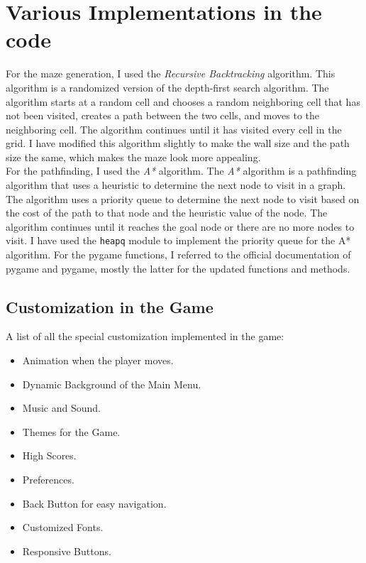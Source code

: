 \documentclass[10pt]{article}
\begin{document}
    \section{Various Implementations in the code}\label{sec:my-project-journey-and-various-implementations-in-the-code}
    For the maze generation, I used the \emph{Recursive Backtracking} algorithm.
    This algorithm is a randomized version of the depth-first search algorithm.
    The algorithm starts at a random cell and chooses a random neighboring cell that has not been visited, creates a path between the two cells, and moves to the neighboring cell.
    The algorithm continues until it has visited every cell in the grid.
    I have modified this algorithm slightly to make the wall size and the path size the same, which makes the maze look more appealing.
    \cite{MazeGeneration}\\
    For the pathfinding, I used the \emph{A*} algorithm.
    The \emph{A*} algorithm is a pathfinding algorithm that uses a heuristic to determine the next node to visit in a graph.
    The algorithm uses a priority queue to determine the next node to visit based on the cost of the path to that node and the heuristic value of the node.
    The algorithm continues until it reaches the goal node or there are no more nodes to visit.
    I have used the \texttt{heapq} module to implement the priority queue for the A* algorithm.
    \cite{MazeSolver}
    For the pygame functions, I referred to the official documentation of pygame\cite{pygameDoc} and pygame\cite{pygameCEDoc}, mostly the latter for the updated functions and methods.\\

    \subsection{Customization in the Game}\label{subsec:customisations-in-the-game}
    A list of all the special customization implemented in the game:
    \begin{itemize}
        \item Animation when the player moves.
        \item Dynamic Background of the Main Menu.
        \item Music and Sound.
        \item Themes for the Game.
        \item High Scores.
        \item Preferences.
        \item Back Button for easy navigation.
        \item Customized Fonts.
        \item Responsive Buttons.
    \end{itemize}
\end{document}
